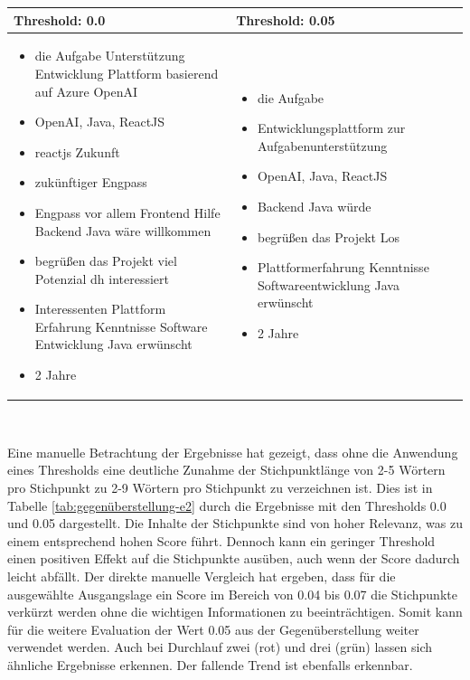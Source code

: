 \begin{center}
	\begin{tabularx}{1\textwidth} { 
			| >{\raggedright\arraybackslash}X 
			|| >{\raggedright\arraybackslash}X | }
		\hline
		Threshold: 0.0
		& Threshold: 0.05 \\
		\hline
		\begin{itemize}[topsep=0pt]
			\itemsep-0.5em
			\item die Aufgabe Unterstützung Entwicklung Plattform basierend auf Azure OpenAI
			\item OpenAI, Java, ReactJS
			\item reactjs Zukunft
			\item zukünftiger Engpass
			\item Engpass vor allem Frontend Hilfe Backend Java wäre willkommen
			\item begrüßen das Projekt viel Potenzial dh interessiert
			\item Interessenten Plattform Erfahrung Kenntnisse Software Entwicklung Java erwünscht
			\item 2 Jahre
		\end{itemize} & \begin{itemize}[topsep=0pt]
		\itemsep-0.5em
		\item die Aufgabe
		\item Entwicklungsplattform zur Aufgabenunterstützung
		\item OpenAI, Java, ReactJS
		\item Backend Java würde
		\item begrüßen das Projekt Los
		\item Plattformerfahrung Kenntnisse Softwareentwicklung Java erwünscht
		\item 2 Jahre
		\end{itemize}\\
		\hline
	\end{tabularx}\\
	\label{tab:gegenüberstellung-e2}
\end{center}
Eine manuelle Betrachtung der Ergebnisse hat gezeigt, dass ohne die Anwendung eines Thresholds eine deutliche Zunahme der Stichpunktlänge von 2-5 Wörtern pro Stichpunkt zu 2-9 Wörtern pro Stichpunkt zu verzeichnen ist. Dies ist in Tabelle \ref{tab:gegenüberstellung-e2} durch die Ergebnisse mit den Thresholds 0.0 und 0.05 dargestellt. Die Inhalte der Stichpunkte sind von hoher Relevanz, was zu einem entsprechend hohen Score führt. Dennoch kann ein geringer Threshold einen positiven Effekt auf die Stichpunkte ausüben, auch wenn der Score dadurch leicht abfällt. Der direkte manuelle Vergleich hat ergeben, dass für die ausgewählte Ausgangslage ein Score im Bereich von 0.04 bis 0.07 die Stichpunkte verkürzt werden ohne die wichtigen Informationen zu beeinträchtigen. Somit kann für die weitere Evaluation der Wert 0.05 aus der Gegenüberstellung weiter verwendet werden. Auch bei Durchlauf zwei (rot) und drei (grün) lassen sich ähnliche Ergebnisse erkennen. Der fallende Trend ist ebenfalls erkennbar.
